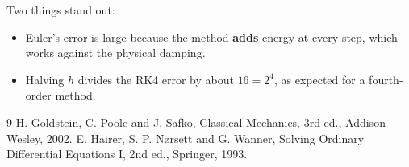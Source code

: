 \documentclass[11pt,a4paper]{article}
\begin{document}
Two things stand out:

\begin{itemize}
  \item Euler's error is large because the method \textbf{adds} energy at every step, which works against the physical damping.
  \item Halving $h$ divides the RK4 error by about $16=2^{4}$, as expected for a fourth-order method.
\end{itemize}

\begin{thebibliography}{9}
 H. Goldstein, C. Poole and J. Safko, Classical Mechanics, 3rd ed., Addison-Wesley, 2002.
 E. Hairer, S. P. Nørsett and G. Wanner, Solving Ordinary Differential Equations I, 2nd ed., Springer, 1993.
\end{thebibliography}
\end{document}
